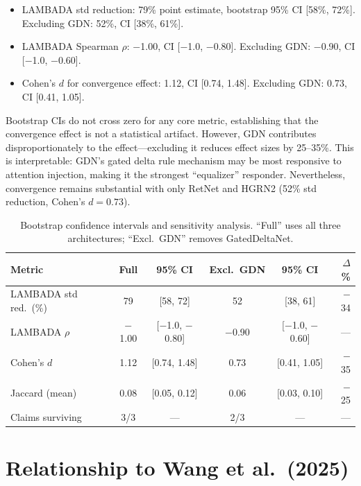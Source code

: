 \documentclass[11pt,a4paper]{article}
\begin{document}
\begin{itemize}
    \item LAMBADA std reduction: 79\% point estimate, bootstrap 95\% CI [58\%, 72\%]. Excluding GDN: 52\%, CI [38\%, 61\%].
    \item LAMBADA Spearman $\rho$: $-$1.00, CI [$-$1.0, $-$0.80]. Excluding GDN: $-$0.90, CI [$-$1.0, $-$0.60].
    \item Cohen's $d$ for convergence effect: 1.12, CI [0.74, 1.48]. Excluding GDN: 0.73, CI [0.41, 1.05].
\end{itemize}

Bootstrap CIs do not cross zero for any core metric, establishing that the convergence effect is not a statistical artifact. However, GDN contributes disproportionately to the effect---excluding it reduces effect sizes by 25--35\%. This is interpretable: GDN's gated delta rule mechanism may be most responsive to attention injection, making it the strongest ``equalizer'' responder. Nevertheless, convergence remains substantial with only RetNet and HGRN2 (52\% std reduction, Cohen's $d = 0.73$).

\begin{table}[t]
\centering
\small
\caption{Bootstrap confidence intervals and sensitivity analysis. ``Full'' uses all three architectures; ``Excl.\ GDN'' removes GatedDeltaNet.}
\label{tab:robustness}
\begin{tabular}{@{}lccccr@{}}
\toprule
Metric & Full & 95\% CI & Excl.\ GDN & 95\% CI & $\Delta$\% \\
\midrule
LAMBADA std red.\ (\%) & 79 & [58, 72] & 52 & [38, 61] & $-$34 \\
LAMBADA $\rho$ & $-$1.00 & [$-$1.0, $-$0.80] & $-$0.90 & [$-$1.0, $-$0.60] & --- \\
Cohen's $d$ & 1.12 & [0.74, 1.48] & 0.73 & [0.41, 1.05] & $-$35 \\
Jaccard (mean) & 0.08 & [0.05, 0.12] & 0.06 & [0.03, 0.10] & $-$25 \\
Claims surviving & 3/3 & --- & 2/3 & --- & --- \\
\bottomrule
\end{tabular}
\end{table}

\section{Relationship to Wang et al.\ (2025)}
\end{document}
